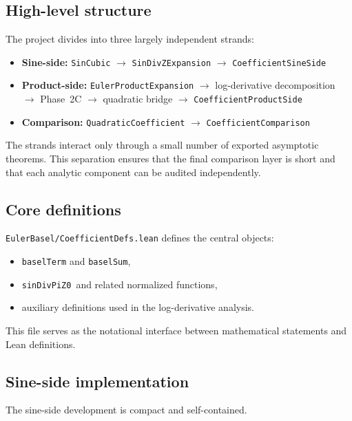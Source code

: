 \documentclass[11pt,a4paper]{article}
\theoremstyle{plain}
\theoremstyle{definition}
\DeclareRobustCommand{\leanid}[1]{\texttt{#1}}
\newcommand{\sinDivPiZZero}{\leanid{sinDivPiZ0}}
\begin{document}
\subsection{High-level structure}

The project divides into three largely independent strands:

\begin{itemize}[leftmargin=2em]
  \item \textbf{Sine-side:}
  \texttt{SinCubic}
  \(\to\)
  \texttt{SinDivZExpansion}
  \(\to\)
  \texttt{CoefficientSineSide}

  \item \textbf{Product-side:}
  \texttt{EulerProductExpansion}
  \(\to\)
  log-derivative decomposition
  \(\to\)
  Phase~2C
  \(\to\)
  quadratic bridge
  \(\to\)
  \texttt{CoefficientProductSide}

  \item \textbf{Comparison:}
  \texttt{QuadraticCoefficient}
  \(\to\)
  \texttt{CoefficientComparison}
\end{itemize}

The strands interact only through a small number of exported asymptotic theorems. This separation ensures that the final comparison layer is short and that each analytic component can be audited independently.

\subsection{Core definitions}

\texttt{EulerBasel/CoefficientDefs.lean} defines the central objects:

\begin{itemize}[leftmargin=2em]
  \item \texttt{baselTerm} and \texttt{baselSum},
  \item \sinDivPiZZero\ and related normalized functions,
  \item auxiliary definitions used in the log-derivative analysis.
\end{itemize}

This file serves as the notational interface between mathematical statements and Lean definitions.

\subsection{Sine-side implementation}

The sine-side development is compact and self-contained.
\end{document}
